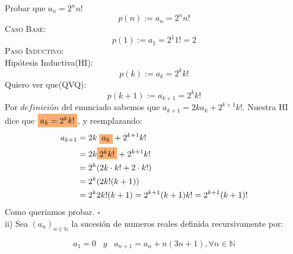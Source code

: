 \documentclass[a4paper,11pt]{article}
\begin{document}
Probar que $a_n = 2^n n!$\\
\[p(n) := a_n = 2^n n!\]
\textsc{Caso Base}:\\
\[p(1):= a_1 = 2^1 1! = 2 \]
\textsc{Paso Inductivo}:\\
Hipótesis Inductiva(HI):\[p(k):= a_k = 2^k k!\]
Quiero ver que(QVQ):\[p(k+1):= a_{k+1} = 2^k k!\]
Por $\textit{definición}$ del enunciado sabemos que $a_{k+1} = 2k a_k + 2^{k+1} k!$. Nuestra HI dice que $\colorbox{Apricot}{$a_k = 2^k k!$}$, y reemplazando:
\begin{align*}
a_{k+1} & = 2k\; \colorbox{Apricot}{$a_k$} + 2^{k+1} k! \\
      & = 2k \colorbox{Apricot}{$2^k k!$} + 2^{k+1} k! \\
      & = 2^k (2k \cdot k! + 2 \cdot k!) \\
      & = 2^k (2k! (k + 1)) \\
      & = 2^k 2k! (k+1) = 2^{k+1} (k+1) k! = 2^{k+1} (k+1)! 
\end{align*}
Como queriamos probar. 
\hfill$\square$\\
ii) Sea $(a_n)_{n \in \mathbb{N}}$ la sucesión de numeros reales definida recursivamente por: 

\[a_1 = 0 \;\;\;y\;\;\; a_{n+1}= a_n +n(3n+1), \forall n \in \mathbb{N} \]
\end{document}
